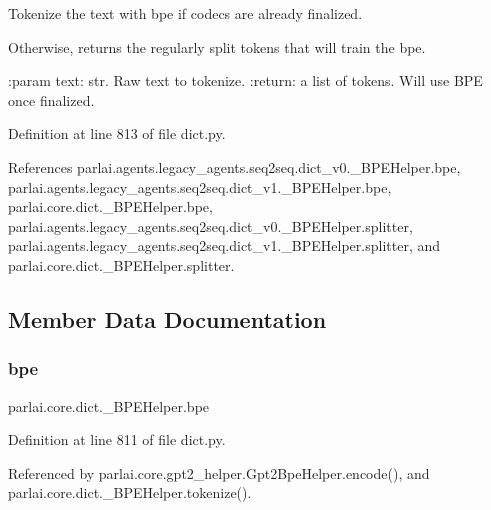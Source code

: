 \begin{DoxyVerb}Tokenize the text with bpe if codecs are already finalized.

Otherwise, returns the regularly split tokens that will train the bpe.

:param text: str. Raw text to tokenize.
:return: a list of tokens. Will use BPE once finalized.
\end{DoxyVerb}
 

Definition at line 813 of file dict.\+py.



References parlai.\+agents.\+legacy\+\_\+agents.\+seq2seq.\+dict\+\_\+v0.\+\_\+\+B\+P\+E\+Helper.\+bpe, parlai.\+agents.\+legacy\+\_\+agents.\+seq2seq.\+dict\+\_\+v1.\+\_\+\+B\+P\+E\+Helper.\+bpe, parlai.\+core.\+dict.\+\_\+\+B\+P\+E\+Helper.\+bpe, parlai.\+agents.\+legacy\+\_\+agents.\+seq2seq.\+dict\+\_\+v0.\+\_\+\+B\+P\+E\+Helper.\+splitter, parlai.\+agents.\+legacy\+\_\+agents.\+seq2seq.\+dict\+\_\+v1.\+\_\+\+B\+P\+E\+Helper.\+splitter, and parlai.\+core.\+dict.\+\_\+\+B\+P\+E\+Helper.\+splitter.



\subsection{Member Data Documentation}
\mbox{\label{classparlai_1_1core_1_1dict_1_1__BPEHelper_af99fd825694f985095fd9ac55fcd2ba3}} 
\subsubsection{\texorpdfstring{bpe}{bpe}}
{\footnotesize\ttfamily parlai.\+core.\+dict.\+\_\+\+B\+P\+E\+Helper.\+bpe}



Definition at line 811 of file dict.\+py.



Referenced by parlai.\+core.\+gpt2\+\_\+helper.\+Gpt2\+Bpe\+Helper.\+encode(), and parlai.\+core.\+dict.\+\_\+\+B\+P\+E\+Helper.\+tokenize().

\mbox{\label{classparlai_1_1core_1_1dict_1_1__BPEHelper_a03ab8d245394a2916d8d73cfe521aebe}} 
